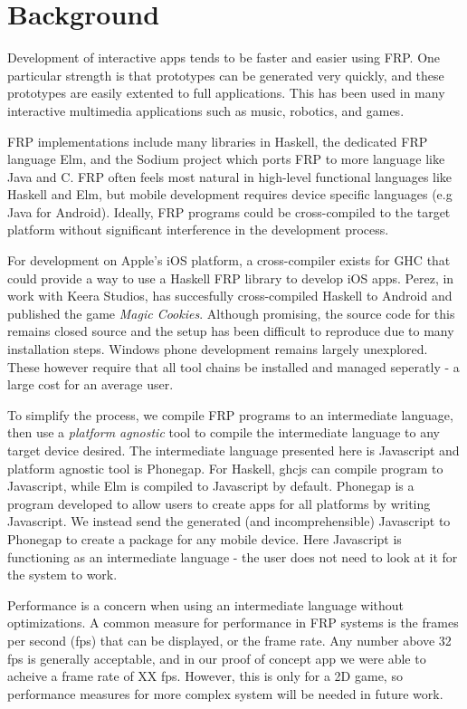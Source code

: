 \documentclass{preprint}
\begin{document}

\section{Background}
Development of interactive apps tends to be faster and easier using FRP.
One particular strength is that prototypes can be generated very quickly, and these prototypes are easily extented to full applications.
This has been used in many interactive multimedia applications such as music, robotics, and games\cite{}.

FRP implementations include many libraries in Haskell, the dedicated FRP language Elm, and the Sodium project which ports FRP to more language like Java and C.
FRP often feels most natural in high-level functional languages like Haskell and Elm, but mobile development requires device specific languages (e.g Java for Android).
Ideally, FRP programs could be cross-compiled to the target platform without significant interference in the development process.

For development on Apple's iOS platform, a cross-compiler exists for GHC that could provide a way to use a Haskell FRP library to develop iOS apps.
Perez, in work with Keera Studios, has succesfully cross-compiled Haskell to Android and published the game \textit{Magic Cookies}\cite{}.
Although promising, the source code for this remains closed source and the setup has been difficult to reproduce due to many installation steps.
Windows phone development remains largely unexplored.
These however require that all tool chains be installed and managed seperatly - a large cost for an average user.

To simplify the process, we compile FRP programs to an intermediate language, then use a \textit{platform agnostic} tool to compile the intermediate language to any target device desired.
The intermediate language presented here is Javascript and platform agnostic tool is Phonegap.
For Haskell, ghcjs can compile program to Javascript, while Elm is compiled to Javascript by default.
Phonegap is a program developed to allow users to create apps for all platforms by writing Javascript. 
We instead send the generated (and incomprehensible) Javascript to Phonegap to create a package for any mobile device.
Here Javascript is functioning as an intermediate language - the user does not need to look at it for the system to work.

Performance is a concern when using an intermediate language without optimizations. 
A common measure for performance in FRP systems is the frames per second (fps) that can be displayed, or the frame rate.
Any number above 32 fps is generally acceptable, and in our proof of concept app we were able to acheive a frame rate of XX fps.
However, this is only for a 2D game, so performance measures for more complex system will be needed in future work.
\end{document}
